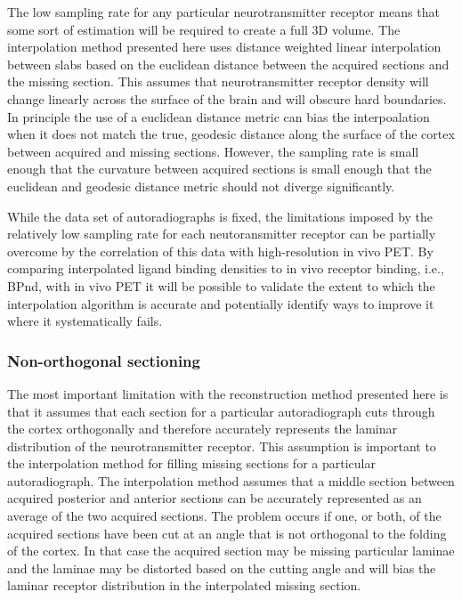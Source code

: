 \documentclass[12pt]{article}
\begin{document}
The low sampling rate for any particular neurotransmitter receptor means that some sort of estimation will be required to create a full 3D volume. The interpolation method presented here uses distance weighted linear interpolation between slabs based on the euclidean distance between the acquired sections and the missing section. This assumes that neurotransmitter receptor density will change linearly across the surface of the brain and will obscure hard boundaries. In principle the use of a euclidean distance metric can bias the interpoalation when it does not match the true, geodesic distance along the surface of the cortex between acquired and missing sections. However, the sampling rate is small enough that the curvature between acquired sections is small enough that the euclidean and geodesic distance metric should not diverge significantly. 

While the data set of autoradiographs is fixed, the limitations imposed by the relatively low sampling rate for each neutoransmitter receptor can be partially overcome by the correlation of this data with high-resolution in vivo PET. By comparing interpolated ligand binding densities to in vivo receptor binding, i.e., BPnd, with in vivo PET it will be possible to validate the extent to which the interpolation algorithm is accurate and potentially identify ways to improve it where it systematically fails. 


\subsubsection{Non-orthogonal sectioning}

The most important limitation with the reconstruction method presented here is that it assumes that each section for a particular autoradiograph cuts through the cortex orthogonally and therefore accurately represents the laminar distribution of the neurotransmitter receptor. This assumption is important to the interpolation method for filling  missing sections for a particular autoradiograph. The interpolation method assumes that a middle section between acquired posterior and anterior sections can be accurately represented as an average of the two acquired sections. The problem occurs if one, or both, of the acquired sections have been cut at an angle that is not orthogonal to the folding of the cortex. In that case the acquired section may be missing particular laminae and the laminae may be distorted based on the cutting angle and will bias the laminar receptor distribution in the interpolated missing section. 
\end{document}
